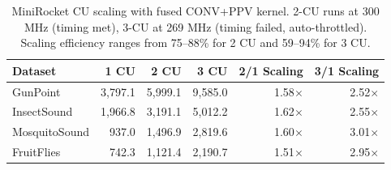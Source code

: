 \begin{table}[t]
\centering
\caption{MiniRocket CU scaling with fused CONV+PPV kernel. 2-CU runs at 300 MHz (timing met), 3-CU at 269 MHz (timing failed, auto-throttled). Scaling efficiency ranges from 75--88\% for 2 CU and 59--94\% for 3 CU.}
\label{tab:cu_scaling}
\begin{tabular}{l r r r r r}
\toprule
Dataset & 1 CU & 2 CU & 3 CU & 2/1 Scaling & 3/1 Scaling \\
\midrule
GunPoint & 3,797.1 & 5,999.1 & 9,585.0 & 1.58$\times$ & 2.52$\times$ \\
InsectSound & 1,966.8 & 3,191.1 & 5,012.2 & 1.62$\times$ & 2.55$\times$ \\
MosquitoSound & 937.0 & 1,496.9 & 2,819.6 & 1.60$\times$ & 3.01$\times$ \\
FruitFlies & 742.3 & 1,121.4 & 2,190.7 & 1.51$\times$ & 2.95$\times$ \\
\bottomrule
\end{tabular}
\end{table}
